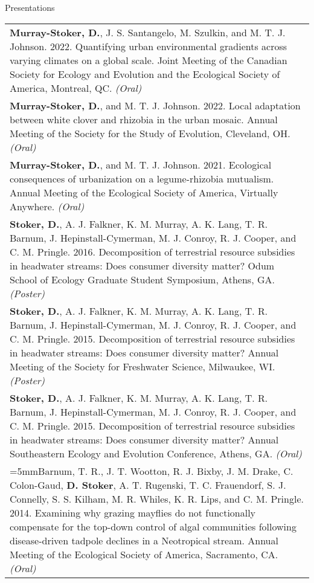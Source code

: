 \documentclass[letterpaper,11pt,oneside]{article}
\begin{document}
\bigskip





\noindent\Large{Presentations}  
\normalsize
\bigskip

\def\arraystretch{1.4}
\noindent \begin{longtable}{@{} >{\raggedright\arraybackslash}p{17.2cm}}
\hangindent=5mm\textbf{Murray-Stoker, D.}, J. S. Santangelo, M. Szulkin, and M. T. J. Johnson. 2022. Quantifying urban environmental gradients across varying climates on a global scale. Joint Meeting of the Canadian Society for Ecology and Evolution and the Ecological Society of America, Montreal, QC. \textit{(Oral)} \\
\hangindent=5mm\textbf{Murray-Stoker, D.}, and M. T. J. Johnson. 2022. Local adaptation between white clover and rhizobia in the urban mosaic. Annual Meeting of the Society for the Study of Evolution, Cleveland, OH. \textit{(Oral)} \\
\hangindent=5mm\textbf{Murray-Stoker, D.}, and M. T. J. Johnson. 2021. Ecological consequences of urbanization on a legume-rhizobia mutualism. Annual Meeting of the Ecological Society of America, Virtually Anywhere. \textit{(Oral)} \\
\hangindent=5mm\textbf{Stoker, D.}, A. J. Falkner, K. M. Murray, A. K. Lang, T. R. Barnum, J. Hepinstall-Cymerman, M. J. Conroy, R. J. Cooper, and C. M. Pringle. 2016. Decomposition of terrestrial resource subsidies in headwater streams: Does consumer diversity matter? Odum School of Ecology Graduate Student Symposium, Athens, GA. \textit{(Poster)} \\
\hangindent=5mm\textbf{Stoker, D.}, A. J. Falkner, K. M. Murray, A. K. Lang, T. R. Barnum, J. Hepinstall-Cymerman, M. J. Conroy, R. J. Cooper, and C. M. Pringle. 2015. Decomposition of terrestrial resource subsidies in headwater streams: Does consumer diversity matter? Annual Meeting of the Society for Freshwater Science, Milwaukee, WI. \textit{(Poster)} \\
\hangindent=5mm\textbf{Stoker, D.}, A. J. Falkner, K. M. Murray, A. K. Lang, T. R. Barnum, J. Hepinstall-Cymerman, M. J. Conroy, R. J. Cooper, and C. M. Pringle. 2015. Decomposition of terrestrial resource subsidies in headwater streams: Does consumer diversity matter? Annual Southeastern Ecology and Evolution Conference, Athens, GA. \textit{(Oral)} \\
\hangindent=5mmBarnum, T. R., J. T. Wootton, R. J. Bixby, J. M. Drake, C. Colon-Gaud, \textbf{D. Stoker}, A. T. Rugenski, T. C. Frauendorf, S. J. Connelly, S. S. Kilham, M. R. Whiles, K. R. Lips, and C. M. Pringle. 2014. Examining why grazing mayflies do not functionally compensate for the top-down control of algal communities following disease-driven tadpole declines in a Neotropical stream. Annual Meeting of the Ecological Society of America, Sacramento, CA. \textit{(Oral)}
\end{longtable}
\end{document}

